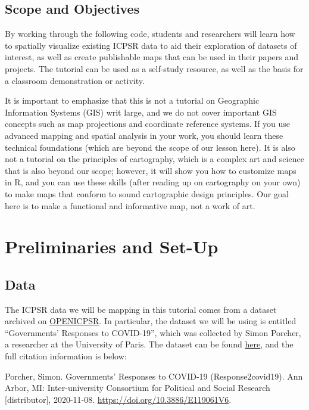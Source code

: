 \documentclass[
]{article}
\begin{document}
\hypertarget{scope-and-objectives}{%
\subsection{Scope and Objectives}\label{scope-and-objectives}}

By working through the following code, students and researchers will learn how to spatially visualize existing ICPSR data to aid their exploration of datasets of interest, as well as create publishable maps that can be used in their papers and projects. The tutorial can be used as a self-study resource, as well as the basis for a classroom demonstration or activity.

It is important to emphasize that this is not a tutorial on Geographic Information Systems (GIS) writ large, and we do not cover important GIS concepts such as map projections and coordinate reference systems. If you use advanced mapping and spatial analysis in your work, you should learn these technical foundations (which are beyond the scope of our lesson here). It is also not a tutorial on the principles of cartography, which is a complex art and science that is also beyond our scope; however, it will show you how to customize maps in R, and you can use these skills (after reading up on cartography on your own) to make maps that conform to sound cartographic design principles. Our goal here is to make a functional and informative map, not a work of art.

\hypertarget{preliminaries-and-set-up}{%
\section{Preliminaries and Set-Up}\label{preliminaries-and-set-up}}

\hypertarget{data}{%
\subsection{Data}\label{data}}

The ICPSR data we will be mapping in this tutorial comes from a dataset archived on \href{https://www.openicpsr.org/openicpsr/}{OPENICPSR}. In particular, the dataset we will be using is entitled ``Governments' Responses to COVID-19'', which was collected by Simon Porcher, a researcher at the University of Paris. The dataset can be found \href{https://www.openicpsr.org/openicpsr/project/119061/version/V6/view}{here}, and the full citation information is below:

Porcher, Simon. Governments' Responses to COVID-19 (Response2covid19). Ann Arbor, MI: Inter-university Consortium for Political and Social Research {[}distributor{]}, 2020-11-08. \url{https://doi.org/10.3886/E119061V6}.
\end{document}
